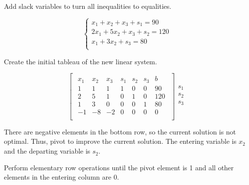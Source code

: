 \documentclass{article}
\begin{document}
\begin{flushleft}
Add slack variables to turn all inequalities to equalities.
\end{flushleft}

\[
\left\{
\begin{array}{c}
x_1 + x_2 + x_3 + s_1 = 90 \\  
2x_1 + 5x_2 + x_3 + s_2 = 120 \\  
x_1 + 3x_2 + s_3 = 80 \\ 
\end{array}
\right.
\]

\begin{flushleft}
Create the initial tableau of the new linear system.
\end{flushleft}

\begin{equation*}
\begin{bmatrix}
\begin{array}{cccccc|c}
x_1 & x_2 & x_3 & s_1 & s_2 & s_3 & b \\ \hline
1 & 1 & 1 & 1 & 0 & 0 & 90 \\
2 & 5 & 1 & 0 & 1 & 0 & 120 \\
1 & 3 & 0 & 0 & 0 & 1 & 80 \\ \hline
-1 & -8 & -2 & 0 & 0 & 0 & 0 \\
\end{array}
\end{bmatrix}
\begin{array}{c}
\\
s_1 \\
s_2 \\
s_3 \\
\\
\end{array}
\end{equation*}

\begin{flushleft}
There are negative elements in the bottom row, so the current solution is not optimal. Thus, pivot to improve the current solution. The entering variable is $x_2$ and the departing variable is $s_2$.
\end{flushleft}

\begin{flushleft}
Perform elementary row operations until the pivot element is 1 and all other elements in the entering column are 0.
\end{flushleft}
\end{document}

